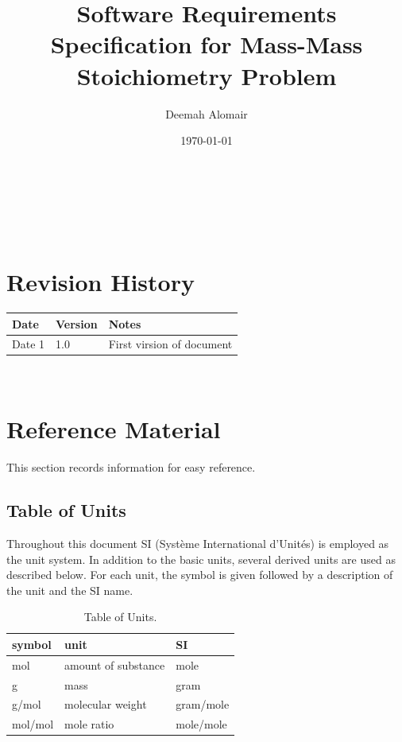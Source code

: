 \documentclass[12pt]{article}
\begin{document}
\title{Software Requirements Specification for Mass-Mass Stoichiometry Problem} 
\author{Deemah Alomair}
\date{\today}
	
\maketitle

~\newpage


\tableofcontents

~\newpage

\section*{Revision History}

\begin{tabularx}{\textwidth}{p{3cm}p{2cm}X}
\toprule {\bf Date} & {\bf Version} & {\bf Notes}\\
\midrule
Date 1 & 1.0 &  First virsion of document\\
\bottomrule
\end{tabularx}

~\newpage

\section{Reference Material}

This section records information for easy reference.

\subsection{Table of Units}

Throughout this document SI (Syst\`{e}me International d'Unit\'{e}s) is employed
as the unit system.  In addition to the basic units, several derived units are
used as described below.  For each unit, the symbol is given followed by a
description of the unit and the SI name.
~\newline

\renewcommand{\arraystretch}{1.2}
\begin{table}[ht]
  \noindent \begin{tabular}{l l l} 
    \toprule		
    \textbf{symbol} & \textbf{unit} & \textbf{SI}\\
    \midrule 
    \si{\mol} & amount of substance & mole\\
    \si{\gram} & mass	& gram\\
    \si{\gram / \mol} & molecular weight & gram/mole \\
    \si{\mol / \mol} & mole ratio & mole/mole\\
       \bottomrule
       \hline
  \end{tabular}  
\caption{Table of Units. }

   \end{table}
  
\end{document}
